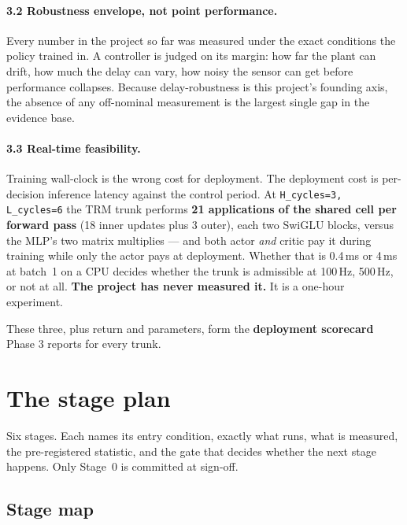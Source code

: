 \documentclass[11pt]{article}
\newcommand{\code}[1]{\texttt{\small #1}}
\begin{document}
\paragraph{3.2 Robustness envelope, not point performance.} Every number in the project so far was measured under the exact conditions the policy trained in. A controller is judged on its margin: how far the plant can drift, how much the delay can vary, how noisy the sensor can get before performance collapses. Because delay-robustness is this project's founding axis, the absence of any off-nominal measurement is the largest single gap in the evidence base.

\paragraph{3.3 Real-time feasibility.} Training wall-clock is the wrong cost for deployment. The deployment cost is per-decision inference latency against the control period. At \code{H\_cycles=3, L\_cycles=6} the TRM trunk performs \textbf{21 applications of the shared cell per forward pass} (18 inner updates plus 3 outer), each two SwiGLU blocks, versus the MLP's two matrix multiplies --- and both actor \emph{and} critic pay it during training while only the actor pays at deployment. Whether that is 0.4\,ms or 4\,ms at batch~1 on a CPU decides whether the trunk is admissible at 100\,Hz, 500\,Hz, or not at all. \textbf{The project has never measured it.} It is a one-hour experiment.

These three, plus return and parameters, form the \textbf{deployment scorecard} Phase 3 reports for every trunk.

\section{The stage plan}

Six stages. Each names its entry condition, exactly what runs, what is measured, the pre-registered statistic, and the gate that decides whether the next stage happens. Only Stage~0 is committed at sign-off.

\subsection{Stage map}
\end{document}
